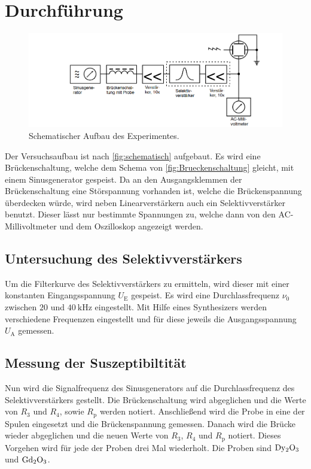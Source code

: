 \section{Durchführung}
\label{sec:Durchführung}
\begin{figure}
    \centering
    \includegraphics[width=\textwidth]{content/Aufbau.png}
    \caption{Schematischer Aufbau des Experimentes.\cite{anleitung}}
    \label{fig:schematisch}
\end{figure}
Der Versuchsaufbau ist nach \autoref{fig:schematisch} aufgebaut. 
Es wird eine Brückenschaltung, welche dem Schema von \autoref{fig:Brueckenschaltung} gleicht, mit einem Sinusgenerator gespeist.
Da an den Ausgangsklemmen der Brückenschaltung eine Störspannung vorhanden ist, welche die Brückenspannung überdecken würde, wird neben Linearverstärkern auch ein Selektivverstärker benutzt.
Dieser lässt nur bestimmte Spannungen zu, welche dann von den AC-Millivoltmeter und dem Oszilloskop angezeigt werden. 

\subsection{Untersuchung des Selektivverstärkers}
Um die Filterkurve des Selektivverstärkers zu ermitteln, wird dieser mit einer konstanten Eingangsspannung $U_{\text{E}}$ gespeist.
Es wird eine Durchlassfrequenz $\nu_0$ zwischen $\num{20}$ und $\SI{40}{\kilo\hertz}$ eingestellt. 
Mit Hilfe eines Synthesizers werden verschiedene Frequenzen eingestellt und für diese jeweils die Ausgangsspannung $U_{\text{A}}$ gemessen.

\subsection{Messung der Suszeptibiltität}
Nun wird die Signalfrequenz des Sinusgenerators auf die Durchlassfrequenz des Selektivverstärkers gestellt.
Die Brückenschaltung wird abgeglichen und die Werte von $R_3$ und $R_4$, sowie $R_{\text{p}}$ werden notiert.
Anschließend wird die Probe in eine der Spulen eingesetzt und die Brückenspannung gemessen.
Danach wird die Brücke wieder abgeglichen und die neuen Werte von $R_3$, $R_4$ und $R_{\text{p}}$ notiert.
Dieses Vorgehen wird für jede der Proben drei Mal wiederholt.
Die Proben sind $\ce{Dy2O3}$ und $\ce{Gd2O3}$.